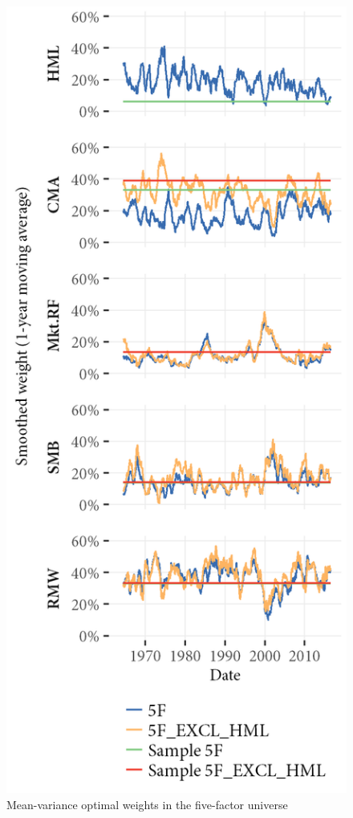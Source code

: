 \begin{figure}[htbp]
  \caption{Mean-variance optimal weights in the five-factor universe}
  \label{fig:mv_optimal_5}
  \centering
  \begin{minipage}{\textwidth}
  \includegraphics[scale = 1]{graphics/Weights_5F_EXCL_HML_5F.png}

\end{minipage}
\end{figure}
